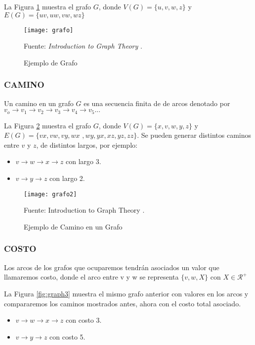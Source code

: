 La Figura \ref{fig:graph} muestra el grafo $G$, donde $V(G) = \{u,v,w,z\}$ y $E(G) = \{uv,uw,vw,wz\}$

\begin{figure}[h]
\centering
\texttt{[image: grafo]}
\caption{\label{fig:graph} Ejemplo de Grafo} Fuente: \textit{Introduction to Graph Theory} \cite{wilson1970introduction}.
\end{figure}

\subsubsection{CAMINO}

Un camino en un grafo $G$ es una secuencia finita de de arcos denotado por $v_o \rightarrow v_1 \rightarrow v_2 \rightarrow v_3 \rightarrow v_4 \rightarrow v_5...$

La Figura \ref{fig:graph2} muestra el grafo $G$, donde $V(G) = \{x,v,w,y,z\}$ y $E(G) = \{vx,vw,vy,wx$ $,wy,yx,xz,yz,zz\}$. Se pueden generar distintos caminos entre $v$ y $z$, de distintos largos, por ejemplo:

\begin{itemize}
\item $v \rightarrow w \rightarrow x \rightarrow z$ con largo 3.
\item $v \rightarrow y \rightarrow z$ con largo 2.
\end{itemize}

\begin{figure}[h]
\centering
\texttt{[image: grafo2]}
\caption{\label{fig:graph2} Ejemplo de Camino en un Grafo} Fuente: Introduction to Graph Theory \cite{wilson1970introduction}.
\end{figure}

\subsubsection{COSTO}

Los arcos de los grafos que ocuparemos tendrán asociados un valor que llamaremos costo, donde el arco entre v y w se representa $\{v,w,X\}$ con $X \in \mathcal{R}^+ $

La Figura \ref{fig:graph3} muestra el mismo grafo anterior con valores en los arcos y compararemos los caminos mostrados antes, ahora con el costo total asociado.

\begin{itemize}
\item $v \rightarrow w \rightarrow x \rightarrow z$ con costo 3.
\item $v \rightarrow y \rightarrow z$ con costo 5.
\end{itemize}

